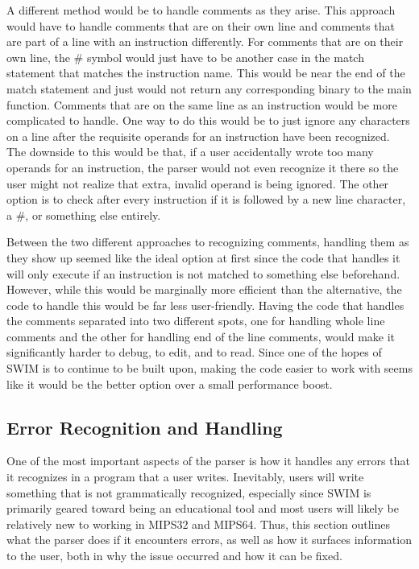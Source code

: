 \documentclass[
    paper=letter,
    parskip=half,
    fontsize=12pt,
    titlepage=firstiscover,
    toc=bibliography,
    numbers=endperiod
]{scrartcl}
\begin{document}
A different method would be to handle comments as they arise. This
approach would have to handle comments that are on their own line and
comments that are part of a line with an instruction differently. For
comments that are on their own line, the \# symbol would just have to be
another case in the match statement that matches the instruction name.
This would be near the end of the match statement and just would not
return any corresponding binary to the main function. Comments that are
on the same line as an instruction would be more complicated to handle.
One way to do this would be to just ignore any characters on a line
after the requisite operands for an instruction have been recognized.
The downside to this would be that, if a user accidentally wrote too
many operands for an instruction, the parser would not even recognize it
there so the user might not realize that extra, invalid operand is being
ignored. The other option is to check after every instruction if it is
followed by a new line character, a \#, or something else entirely.

Between the two different approaches to recognizing comments, handling
them as they show up seemed like the ideal option at first since the
code that handles it will only execute if an instruction is not matched
to something else beforehand. However, while this would be marginally
more efficient than the alternative, the code to handle this would be
far less user-friendly. Having the code that handles the comments
separated into two different spots, one for handling whole line comments
and the other for handling end of the line comments, would make it
significantly harder to debug, to edit, and to read. Since one of the
hopes of SWIM is to continue to be built upon, making the code easier to
work with seems like it would be the better option over a small
performance boost.

\subsection{Error Recognition and Handling}

One of the most important aspects of the parser is how it handles any
errors that it recognizes in a program that a user writes. Inevitably,
users will write something that is not grammatically recognized,
especially since SWIM is primarily geared toward being an educational
tool and most users will likely be relatively new to working in MIPS32
and MIPS64. Thus, this section outlines what the parser does if it
encounters errors, as well as how it surfaces information to the user,
both in why the issue occurred and how it can be fixed.
\end{document}
